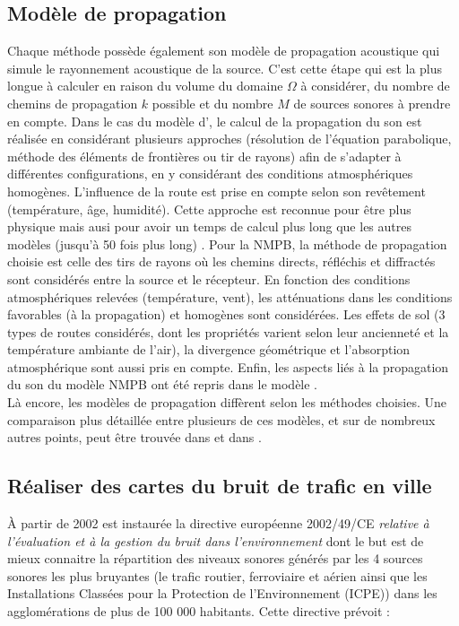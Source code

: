 \subsection{Modèle de propagation}\label{part:modele_propa}
Chaque méthode possède également son modèle de propagation acoustique qui simule le rayonnement acoustique de la source. C'est cette étape qui est la plus longue à calculer en raison du volume du domaine $\Omega$ à considérer, du nombre de chemins de propagation $k$ possible et du nombre $M$ de sources sonores à prendre en compte.
Dans le cas du modèle d', le calcul de la propagation du son est réalisée en considérant plusieurs approches (résolution de l'équation parabolique, méthode des éléments de frontières ou tir de rayons) afin de s'adapter à différentes configurations, en y considérant des conditions atmosphériques homogènes. L'influence de la route est prise en compte selon son revêtement (température, âge, humidité). Cette approche est reconnue pour être plus \og physique \fg{} mais ausi pour avoir un temps de calcul plus long que les autres modèles (jusqu'à 50 fois plus long) \cite{probst2011comparison}. Pour la NMPB, la méthode de propagation choisie est celle des tirs de rayons où les chemins directs, réfléchis et diffractés sont considérés entre la source et le récepteur. En fonction des conditions atmosphériques relevées (température, vent), les atténuations dans les conditions favorables (à la propagation) et homogènes sont considérées. Les effets de sol (3 types de routes considérés, dont les propriétés varient selon leur ancienneté et la température ambiante de l'air), la divergence géométrique et l'absorption atmosphérique sont aussi pris en compte.
Enfin, les aspects liés à la propagation du son du modèle NMPB ont été repris dans le modèle . \\
Là encore, les modèles de propagation diffèrent selon les méthodes choisies. Une comparaison plus détaillée entre plusieurs de ces modèles, et sur de nombreux autres points, peut être trouvée dans \cite{steele_critical_2001} et dans \cite{garg_critical_2014}.

\subsection{Réaliser des cartes du bruit de trafic en ville}

À partir de 2002 est instaurée la directive européenne 2002/49/CE \textit{relative à l'évaluation et à la gestion du bruit dans l'environnement} \cite{directive} dont le but est de mieux connaitre la répartition des niveaux sonores générés par les 4 sources sonores les plus bruyantes (le trafic routier, ferroviaire et aérien ainsi que les Installations Classées pour la Protection de l'Environnement (ICPE)) dans les agglomérations de plus de 100 000 habitants. Cette directive prévoit :


